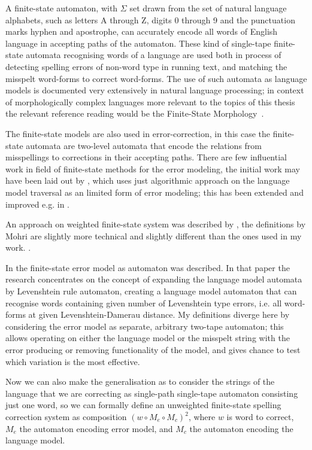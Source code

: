 \documentclass[officiallayout,draft]{unihelcompling}
\begin{document}
A finite-state automaton, with $\Sigma$ set drawn from the set of natural
language alphabets, such as letters A through Z, digits 0 through 9 and the
punctuation marks hyphen and apostrophe, can accurately encode all words of
English language in accepting paths of the automaton. These kind of single-tape
finite-state automata recognising words of a language are used both in process
of detecting spelling errors of non-word type in running text, and matching
the misspelt word-forms to correct word-forms. The use of such automata as
language models is documented very extensively in natural language processing;
in context of morphologically complex languages more relevant to the topics of
this thesis the relevant reference reading would be the Finite-State Morphology~\cite{beesley2003finite,beesley2004morphological}.

The finite-state models are also used in error-correction, in this case the
finite-state automata are two-level automata that encode the relations from
misspellings to corrections in their accepting paths. There are few influential
work in field of finite-state methods for the error modeling, the initial work
may have been laid out by \cite{oflazer1996errortolerant}, which uses just
algorithmic approach on the language model traversal as an limited form of
error modeling; this has been extended and improved e.g. in
\cite{hulden2009fast}. 

An approach on weighted finite-state system was
described by \cite{mohri2003edit}, the definitions by Mohri are slightly more
technical and slightly different than the ones used in my work. .

In \cite{agata2002typographical} the
finite-state error model as automaton was described. In that paper the research
concentrates on the concept of expanding the language model automata by
Levenshtein rule automaton, creating a language model automaton that can
recognise words containing given number of Levenshtein type errors, i.e. all
word-forms at given Levenshtein-Damerau distance. My definitions diverge here
by considering the error model as separate, arbitrary two-tape automaton; this
allows operating on either the language model or the misspelt string with the
error producing or removing functionality of the model, and gives chance to
test which variation is the most effective. 

Now we can also make the generalisation as to consider the strings of the
language that we are correcting as single-path single-tape automaton consisting
just one word, so we can formally define an unweighted finite-state spelling
correction system as composition $(w \circ M_e \circ M_c)^2$, where $w$ is word
to correct, $M_e$ the automaton encoding error model, and $M_c$ the automaton
encoding the language model. 
\end{document}
